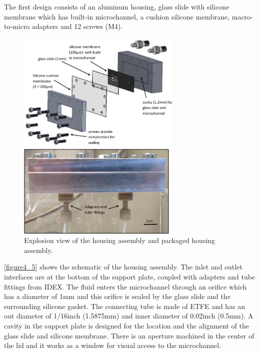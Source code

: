The first design consists of an aluminum housing, glass slide with silicone membrane which has built-in microchannel, a cushion silicone membrane, macro-to-micro adapters and 12 screws (M4).\\

\begin{figure}[h]%
\centering
\includegraphics[width=0.7\textwidth]{figures/packagingandtestunderhighpressure/figure4_6}%
\caption{Explosion view of the housing assembly and packaged housing assembly.}%
\label{figure4_6}%
\end{figure}

\autoref{figure4_5} shows the schematic of the housing assembly. The inlet and outlet interfaces are at the bottom of the support plate, coupled with adapters and tube fittings from IDEX. The fluid enters the microchannel through an orifice which has a diameter of 1mm and this orifice is sealed by the glass slide and the surrounding silicone gasket. The connecting tube is made of ETFE and has an out diameter of 1/16inch (1.5875mm) and inner diameter of 0.02inch (0.5mm). A cavity in the support plate is designed for the location and the alignment of the glass slide and silicone membrane. There is an aperture machined in the center of the lid and it works as a window for visual access to the microchannel. \\

